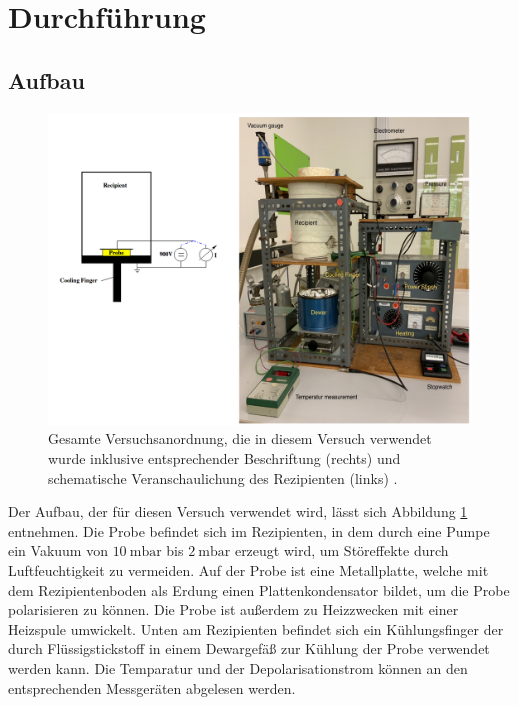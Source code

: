 
\section{Durchführung}
\label{sec:Durchführung}
\subsection{Aufbau}
\begin{figure}
\centering
\includegraphics[width=\textwidth,keepaspectratio]{Dipolrelaxation Versuchsanordnung}
\caption{Gesamte Versuchsanordnung, die in diesem Versuch verwendet wurde inklusive entsprechender Beschriftung (rechts) und schematische Veranschaulichung  des Rezipienten (links) \cite{anleitung}.}
\label{fig:Versuchsanordnung}
\end{figure}
Der Aufbau, der für diesen Versuch verwendet wird, lässt sich Abbildung \ref{fig:Versuchsanordnung} entnehmen. 
Die Probe befindet sich im Rezipienten, in dem durch eine Pumpe ein Vakuum von $\SI{10}{\milli\bar}$ bis $\SI{2}{\milli\bar}$ erzeugt wird, um Störeffekte durch Luftfeuchtigkeit zu vermeiden.
Auf der Probe ist eine Metallplatte, welche mit dem Rezipientenboden als Erdung einen Plattenkondensator bildet, um die Probe polarisieren zu können. Die Probe ist außerdem zu Heizzwecken mit einer Heizspule umwickelt. 
Unten am Rezipienten befindet sich ein Kühlungsfinger der durch Flüssigstickstoff in einem Dewargefäß zur Kühlung der Probe verwendet werden kann. Die Temparatur und der Depolarisationstrom können an den entsprechenden Messgeräten abgelesen werden.
